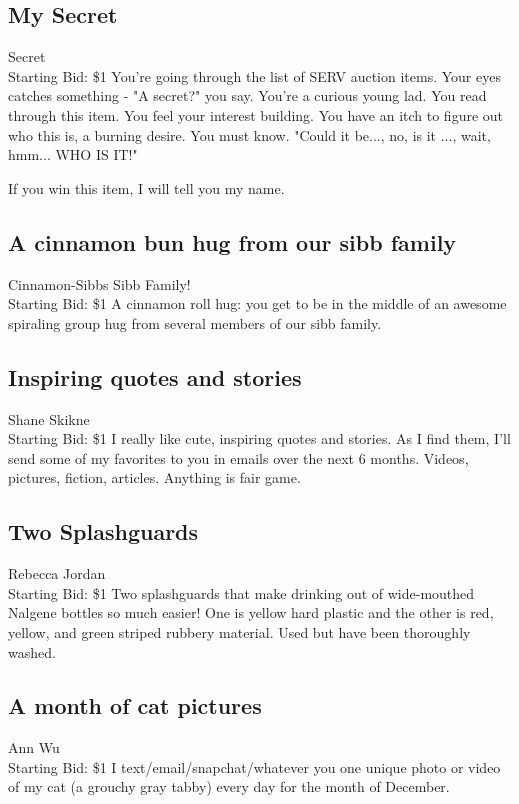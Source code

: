 \documentclass[11pt]{article}
\begin{document}
\subsection{My Secret}
Secret
\\
Starting Bid: \$1
\newline
You're going through the list of SERV auction items. Your eyes catches something - "A secret?" you say. You're a curious young lad. You read through this item. You feel your interest building. You have an itch to figure out who this is, a burning desire. You must know. "Could it be..., no, is it ..., wait, hmm... WHO IS IT!"

If you win this item, I will tell you my name.
\subsection{A cinnamon bun hug from our sibb family}
Cinnamon-Sibbs Sibb Family!
\\
Starting Bid: \$1
\newline
A cinnamon roll hug: you get to be in the middle of an awesome spiraling group hug from several members of our sibb family.
\subsection{Inspiring quotes and stories}
Shane Skikne
\\
Starting Bid: \$1
\newline
I really like cute, inspiring quotes and stories. As I find them, I'll send some of my favorites to you in emails over the next 6 months. Videos, pictures, fiction, articles. Anything is fair game.
\subsection{Two Splashguards}
Rebecca Jordan
\\
Starting Bid: \$1
\newline
Two splashguards that make drinking out of wide-mouthed Nalgene bottles so much easier! One is yellow hard plastic and the other is red, yellow, and green striped rubbery material. Used but have been thoroughly washed.
\subsection{A month of cat pictures}
Ann Wu
\\
Starting Bid: \$1
\newline
I text/email/snapchat/whatever you one unique photo or video of my cat (a grouchy gray tabby) every day for the month of December.
\end{document}
